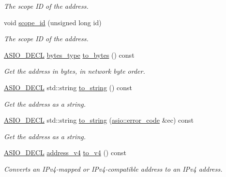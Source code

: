 \begin{DoxyCompactItemize}
\begin{DoxyCompactList}\small\item\em The scope I\+D of the address. \end{DoxyCompactList}\item 
void \hyperlink{classasio_1_1ip_1_1address__v6_a0c2e1d04b56cea467db07f11a314df37}{scope\+\_\+id} (unsigned long id)
\begin{DoxyCompactList}\small\item\em The scope I\+D of the address. \end{DoxyCompactList}\item 
\hyperlink{config_8hpp_ab54d01ea04afeb9a8b39cfac467656b7}{A\+S\+I\+O\+\_\+\+D\+E\+C\+L} \hyperlink{classasio_1_1ip_1_1address__v6_a8a3e5d2312af4134087ad3ebdaad7881}{bytes\+\_\+type} \hyperlink{classasio_1_1ip_1_1address__v6_a49e8ec4d5ae970d954ed37f7096faa94}{to\+\_\+bytes} () const 
\begin{DoxyCompactList}\small\item\em Get the address in bytes, in network byte order. \end{DoxyCompactList}\item 
\hyperlink{config_8hpp_ab54d01ea04afeb9a8b39cfac467656b7}{A\+S\+I\+O\+\_\+\+D\+E\+C\+L} std\+::string \hyperlink{classasio_1_1ip_1_1address__v6_a014497b783c150f6d2ed0172223bf9f8}{to\+\_\+string} () const 
\begin{DoxyCompactList}\small\item\em Get the address as a string. \end{DoxyCompactList}\item 
\hyperlink{config_8hpp_ab54d01ea04afeb9a8b39cfac467656b7}{A\+S\+I\+O\+\_\+\+D\+E\+C\+L} std\+::string \hyperlink{classasio_1_1ip_1_1address__v6_a8ff8a33c7fcae04b80a9a31dad409b28}{to\+\_\+string} (\hyperlink{classasio_1_1error__code}{asio\+::error\+\_\+code} \&ec) const 
\begin{DoxyCompactList}\small\item\em Get the address as a string. \end{DoxyCompactList}\item 
\hyperlink{config_8hpp_ab54d01ea04afeb9a8b39cfac467656b7}{A\+S\+I\+O\+\_\+\+D\+E\+C\+L} \hyperlink{classasio_1_1ip_1_1address__v4}{address\+\_\+v4} \hyperlink{classasio_1_1ip_1_1address__v6_a59f236962c5936cfeeadddd8e5950fc9}{to\+\_\+v4} () const 
\begin{DoxyCompactList}\small\item\em Converts an I\+Pv4-\/mapped or I\+Pv4-\/compatible address to an I\+Pv4 address. \end{DoxyCompactList}\item 

\end{DoxyCompactItemize}

